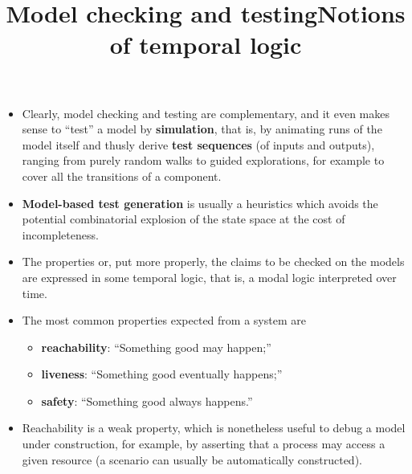 \documentclass[wide]{slides}
\begin{document}
\begin{slide}
  \title{Model checking and testing}

  \begin{itemize}

    \item Clearly, model checking and testing are complementary, and
      it even makes sense to ``test'' a model by \textbf{simulation},
      that is, by animating runs of the model itself and thusly derive
      \textbf{test sequences} (of inputs and outputs), ranging from
      purely random walks to guided explorations, for example to cover
      all the transitions of a component.

    \item \textbf{Model\hyp{}based test generation} is usually a
      heuristics which avoids the potential combinatorial explosion of
      the state space at the cost of incompleteness.

  \end{itemize}

\end{slide}

\begin{slide}
  \title{Notions of temporal logic}

  \begin{itemize}

    \item The properties or, put more properly, the claims to be
      checked on the models are expressed in some temporal logic, that
      is, a modal logic interpreted over time.

    \item The most common properties expected from a system are
      \begin{itemize}

        \item \textbf{reachability}: ``Something good may
          happen;''

        \item \textbf{liveness}: ``Something good eventually
          happens;''

        \item \textbf{safety}: ``Something good always happens.''

      \end{itemize}

    \item Reachability is a weak property, which is nonetheless useful
      to debug a model under construction, for example, by asserting
      that a process may access a given resource (a scenario can
      usually be automatically constructed).

  \end{itemize}

\end{slide}
\end{document}
